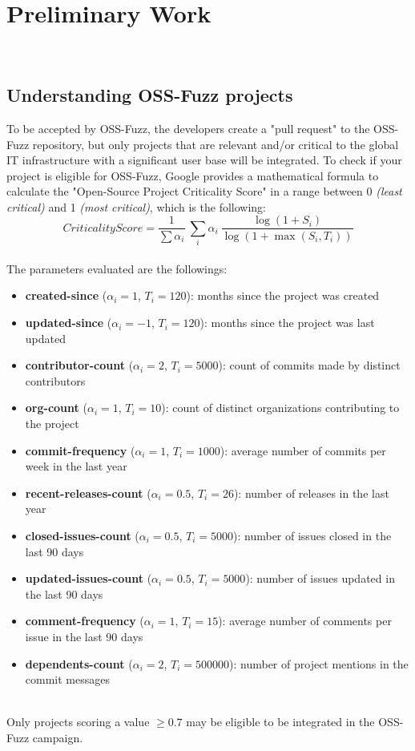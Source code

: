 \chapter{Preliminary Work}
\ \\
\section{Understanding OSS-Fuzz projects}
To be accepted by OSS-Fuzz, the developers create a "pull request" to the OSS-Fuzz repository, but only projects that are relevant and/or critical to the global IT infrastructure with a significant user base will be integrated.
\newline \newline
To check if your project is eligible for OSS-Fuzz, Google provides a mathematical formula to calculate the "Open-Source Project Criticality Score" \cite{score} in a range between 0 \textit{(least critical)} and 1 \textit{(most critical)}, which is the following:
\ \\
\begin{equation}
    CriticalityScore = \frac{1}{\sum \alpha_i}\  \sum_i \alpha_i \ \frac{\log(1+S_i)}{\log(1+\max(S_i,T_i))}
\end{equation}
\ \\
The parameters evaluated are the followings:
\begin{itemize}
    \item \textbf{created-since} ($\alpha_i = 1$, $T_i = 120$): months since the project was created
    \item \textbf{updated-since} ($\alpha_i = -1$, $T_i = 120$): months since the project was last updated
    \item \textbf{contributor-count} ($\alpha_i = 2$, $T_i = 5000$): count of commits made by distinct contributors
    \item \textbf{org-count} ($\alpha_i = 1$, $T_i = 10$): count of distinct organizations contributing to the project
    \item \textbf{commit-frequency} ($\alpha_i = 1$, $T_i = 1000$): average number of commits per week in the last year
    \item \textbf{recent-releases-count} ($\alpha_i = 0.5$, $T_i = 26$): number of releases in the last year
    \item \textbf{closed-issues-count} ($\alpha_i = 0.5$, $T_i = 5000$): number of issues closed in the last 90 days
    \item \textbf{updated-issues-count} ($\alpha_i = 0.5$, $T_i = 5000$): number of issues updated in the last 90 days
    \item \textbf{comment-frequency} ($\alpha_i = 1$, $T_i = 15$): average number of comments per issue in the last 90 days
    \item \textbf{dependents-count} ($\alpha_i = 2$, $T_i = 500000$): number of project mentions in the commit messages
\end{itemize}
\ \\
Only projects scoring a value $\geq 0.7$ may be eligible to be integrated in the OSS-Fuzz campaign.

